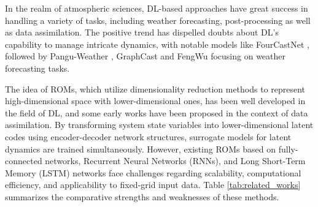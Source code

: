 \documentclass{article}
\newcommand{\mX}{\mathcal{X}}
\newcommand{\mZ}{\mathcal{Z}}
\begin{document}
In the realm of atmospheric sciences, DL-based approaches have great success in handling a variety of tasks, including weather forecasting, post-processing as well as data assimilation. The positive trend has dispelled doubts \cite{Schultz2021CanDL} about DL's capability to manage intricate dynamics, with notable models like FourCastNet \cite{FourCastNet}, followed by Pangu-Weather \cite{Pangu}, GraphCast \cite{GraphCast} and FengWu \cite{FengWu} focusing on weather forecasting tasks.

The idea of ROMs, which utilize dimensionality reduction methods to represent high-dimensional space with lower-dimensional ones, has been well developed in the field of DL, and some early works \cite{Peyron2021LAwithAE,LatentspaceDA-RNN,ROM-DA,GeneralizedLA} have been proposed in the context of data assimilation. By transforming system state variables into lower-dimensional latent codes using encoder-decoder network structures, surrogate models for latent dynamics are trained simultaneously. However, existing ROMs based on fully-connected networks, Recurrent Neural Networks (RNNs), and Long Short-Term Memory (LSTM) networks face challenges regarding scalability, computational efficiency, and applicability to fixed-grid input data. Table \ref{tab:related_works} summarizes the comparative strengths and weaknesses of these methods.
\end{document}
